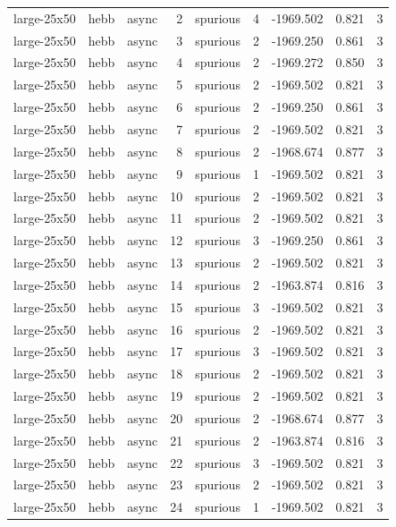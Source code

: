 \begin{tabular}{lllrlrrrr}
large-25x50 & hebb & async & 2 & spurious & 4 & -1969.502 & 0.821 & 3 \\
large-25x50 & hebb & async & 3 & spurious & 2 & -1969.250 & 0.861 & 3 \\
large-25x50 & hebb & async & 4 & spurious & 2 & -1969.272 & 0.850 & 3 \\
large-25x50 & hebb & async & 5 & spurious & 2 & -1969.502 & 0.821 & 3 \\
large-25x50 & hebb & async & 6 & spurious & 2 & -1969.250 & 0.861 & 3 \\
large-25x50 & hebb & async & 7 & spurious & 2 & -1969.502 & 0.821 & 3 \\
large-25x50 & hebb & async & 8 & spurious & 2 & -1968.674 & 0.877 & 3 \\
large-25x50 & hebb & async & 9 & spurious & 1 & -1969.502 & 0.821 & 3 \\
large-25x50 & hebb & async & 10 & spurious & 2 & -1969.502 & 0.821 & 3 \\
large-25x50 & hebb & async & 11 & spurious & 2 & -1969.502 & 0.821 & 3 \\
large-25x50 & hebb & async & 12 & spurious & 3 & -1969.250 & 0.861 & 3 \\
large-25x50 & hebb & async & 13 & spurious & 2 & -1969.502 & 0.821 & 3 \\
large-25x50 & hebb & async & 14 & spurious & 2 & -1963.874 & 0.816 & 3 \\
large-25x50 & hebb & async & 15 & spurious & 3 & -1969.502 & 0.821 & 3 \\
large-25x50 & hebb & async & 16 & spurious & 2 & -1969.502 & 0.821 & 3 \\
large-25x50 & hebb & async & 17 & spurious & 3 & -1969.502 & 0.821 & 3 \\
large-25x50 & hebb & async & 18 & spurious & 2 & -1969.502 & 0.821 & 3 \\
large-25x50 & hebb & async & 19 & spurious & 2 & -1969.502 & 0.821 & 3 \\
large-25x50 & hebb & async & 20 & spurious & 2 & -1968.674 & 0.877 & 3 \\
large-25x50 & hebb & async & 21 & spurious & 2 & -1963.874 & 0.816 & 3 \\
large-25x50 & hebb & async & 22 & spurious & 3 & -1969.502 & 0.821 & 3 \\
large-25x50 & hebb & async & 23 & spurious & 2 & -1969.502 & 0.821 & 3 \\
large-25x50 & hebb & async & 24 & spurious & 1 & -1969.502 & 0.821 & 3 \\

\end{tabular}
